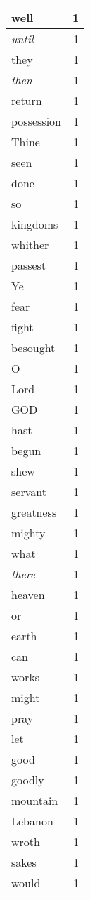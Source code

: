 \begin{center}
\begin{longtable}{l|r}
well & 1 \\ \hline
\emph{until} & 1 \\ \hline
they & 1 \\ \hline
\emph{then} & 1 \\ \hline
return & 1 \\ \hline
possession & 1 \\ \hline
Thine & 1 \\ \hline
seen & 1 \\ \hline
done & 1 \\ \hline
so & 1 \\ \hline
kingdoms & 1 \\ \hline
whither & 1 \\ \hline
passest & 1 \\ \hline
Ye & 1 \\ \hline
fear & 1 \\ \hline
fight & 1 \\ \hline
besought & 1 \\ \hline
O & 1 \\ \hline
Lord & 1 \\ \hline
GOD & 1 \\ \hline
hast & 1 \\ \hline
begun & 1 \\ \hline
shew & 1 \\ \hline
servant & 1 \\ \hline
greatness & 1 \\ \hline
mighty & 1 \\ \hline
what & 1 \\ \hline
\emph{there} & 1 \\ \hline
heaven & 1 \\ \hline
or & 1 \\ \hline
earth & 1 \\ \hline
can & 1 \\ \hline
works & 1 \\ \hline
might & 1 \\ \hline
pray & 1 \\ \hline
let & 1 \\ \hline
good & 1 \\ \hline
goodly & 1 \\ \hline
mountain & 1 \\ \hline
Lebanon & 1 \\ \hline
wroth & 1 \\ \hline
sakes & 1 \\ \hline
would & 1 \\ \hline

\end{longtable}
\end{center}
